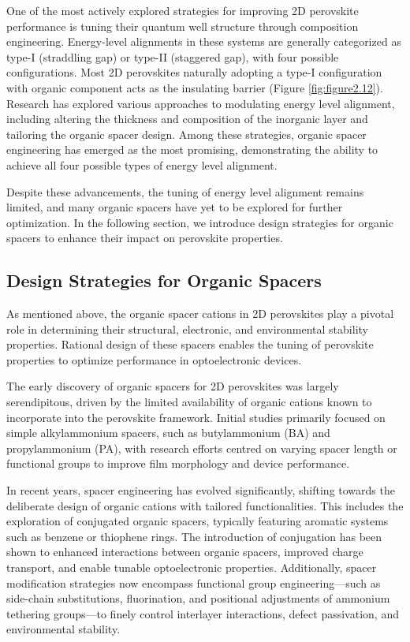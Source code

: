 One of the most actively explored strategies for improving 2D perovskite performance is tuning their quantum well structure through composition engineering. Energy-level alignments in these systems are generally categorized as type-I (straddling gap) or type-II (staggered gap), with four possible configurations. Most 2D perovskites naturally adopting a type-I configuration with organic component acts as the insulating barrier (Figure \ref{fig:figure2.12}). Research has explored various approaches to modulating energy level alignment, including altering the thickness and composition of the inorganic layer and tailoring the organic spacer design\cite{RN20,RN626,RN305}. Among these strategies, organic spacer engineering has emerged as the most promising, demonstrating the ability to achieve all four possible types of energy level alignment.

Despite these advancements, the tuning of energy level alignment remains limited, and many organic spacers have yet to be explored for further optimization. In the following section, we introduce design strategies for organic spacers to enhance their impact on perovskite properties.

\subsection{Design Strategies for Organic Spacers}

As mentioned above, the organic spacer cations in 2D perovskites play a pivotal role in determining their structural, electronic, and environmental stability properties. Rational design of these spacers enables the tuning of perovskite properties to optimize performance in optoelectronic devices.

The early discovery of organic spacers for 2D perovskites was largely serendipitous, driven by the limited availability of organic cations known to incorporate into the perovskite framework. Initial studies primarily focused on simple alkylammonium spacers, such as butylammonium (BA) and propylammonium (PA), with research efforts centred on varying spacer length or functional groups to improve film morphology and device performance\cite{RN135,RN504,RN217}. 

In recent years, spacer engineering has evolved significantly, shifting towards the deliberate design of organic cations with tailored functionalities. This includes the exploration of conjugated organic spacers, typically featuring aromatic systems such as benzene or thiophene rings\cite{RN218,RN31}. The introduction of conjugation has been shown to enhanced interactions between organic spacers, improved charge transport, and enable tunable optoelectronic properties\cite{RN228}. Additionally, spacer modification strategies now encompass functional group engineering—such as side-chain substitutions, fluorination, and positional adjustments of ammonium tethering groups—to finely control interlayer interactions, defect passivation, and environmental stability.

